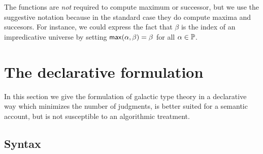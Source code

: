 \documentclass{article}
\begin{document}
The functions are \emph{not} required to compute maximum or successor, but we use the
suggestive notation because in the standard case they do compute maxima and succesors. For
instance, we could express the fact that $\beta$ is the index of an impredicative universe
by setting $\mathsf{max}(\alpha,\beta) = \beta$ for all $\alpha \in \mathbb{P}$.

\section{The declarative formulation}
\label{sec:declarative-formulation}

In this section we give the formulation of galactic type theory in a declarative way
which minimizes the number of judgments, is better suited for a semantic account, but is
not susceptible to an algorithmic treatment.

\subsection{Syntax}
\label{sec:syntax}
\end{document}
